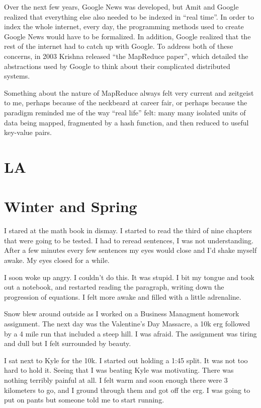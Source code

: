 \documentclass[12pt]{memoir}
\begin{document}
Over the next few years, Google News was developed, but Amit and Google realized
that everything else also needed to be indexed in ``real time''.  In order to
index the whole internet, every day, the programming methods used to create
Google News would have to be formalized.  In addition, Google realized that the
rest of the internet had to catch up with Google.  To address both of these
concerns, in 2003 Krishna released ``the MapReduce paper'', which detailed the
abstractions used by Google to think about their complicated distributed
systems.  

Something about the nature of MapReduce always felt very current and zeitgeist
to me, perhaps because of the neckbeard at career fair, or perhaps because the
paradigm reminded me of the way ``real life'' felt: many many isolated units of
data being mapped, fragmented by a hash function, and then reduced to useful
key-value pairs.


\chapter{LA}


\chapter{Winter and Spring}

I stared at the math book in dismay.  I started to read the third of nine
chapters that were going to be tested.  I had to reread sentences, I was
not understanding.  After a few minutes every few sentences my eyes would close
and I'd shake myself awake.  My eyes closed for a while.

I soon woke up angry.  I couldn't do this.  It was stupid.  I bit my tongue and
took out a notebook, and restarted reading the paragraph, writing down the
progression of equations.  I felt more awake and filled with a little
adrenaline.   

Snow blew around outside as I worked on a Business Managment homework
assignment.  The next day was the Valentine's Day Massacre, a 10k erg followed
by a 4 mile run that included a steep hill.  I was afraid.  The assignment was
tiring and dull but I felt surrounded by beauty.

I sat next to Kyle for the 10k.  I started out holding a 1:45 split.  It
was not too hard to hold it.  Seeing that I was beating Kyle was motivating.
There was nothing terribly painful at all.  I felt warm and soon enough there
were 3 kilometers to go, and I ground through them and got off the erg.  I was
going to put on pants but someone told me to start running.
\end{document}
